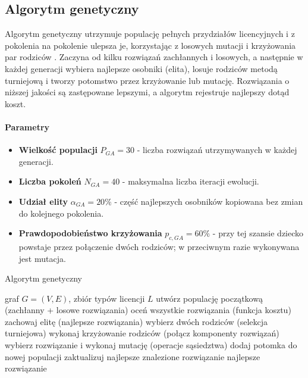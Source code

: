 \subsection{Algorytm genetyczny}\label{subsec:ga}
Algorytm genetyczny utrzymuje populację pełnych przydziałów licencyjnych i z pokolenia na pokolenie ulepsza je, korzystając z losowych mutacji i krzyżowania par rodziców \cite{holland1975,goldberg1989}. Zaczyna od kilku rozwiązań zachłannych i losowych, a następnie w każdej generacji wybiera najlepsze osobniki (elita), losuje rodziców metodą turniejową i tworzy potomstwo przez krzyżowanie lub mutację. Rozwiązania o niższej jakości są zastępowane lepszymi, a algorytm rejestruje najlepszy dotąd koszt.

\paragraph{Parametry}
\begin{itemize}
  \item \textbf{Wielkość populacji} $P_{GA}=30$ - liczba rozwiązań utrzymywanych w każdej generacji.
  \item \textbf{Liczba pokoleń} $N_{GA}=40$ - maksymalna liczba iteracji ewolucji.
  \item \textbf{Udział elity} $\alpha_{GA}=20\%$ - część najlepszych osobników kopiowana bez zmian do kolejnego pokolenia.
  \item \textbf{Prawdopodobieństwo krzyżowania} $p_{c,GA}=60\%$ - przy tej szansie dziecko powstaje przez połączenie dwóch rodziców; w przeciwnym razie wykonywana jest mutacja.
\end{itemize}

\begin{algorithm}[H]
  \caption{Algorytm genetyczny}
  \label{alg:ga}
  \begin{algorithmic}[1]
    \Require graf $G=(V,E)$, zbiór typów licencji $L$
    \State utwórz populację początkową (zachłanny + losowe rozwiązania)
    \State oceń wszystkie rozwiązania (funkcja kosztu)
    \State zachowaj elitę (najlepsze rozwiązania)
    \State wybierz dwóch rodziców (selekcja turniejowa)
    \State wykonaj krzyżowanie rodziców (połącz komponenty rozwiązań)
    \Else
    \State wybierz rozwiązanie i wykonaj mutację (operacje sąsiedztwa)
    \EndIf
    \State dodaj potomka do nowej populacji
    \EndWhile
    \State zaktualizuj najlepsze znalezione rozwiązanie
    \EndFor
    \State \Return najlepsze rozwiązanie
  \end{algorithmic}
\end{algorithm}

